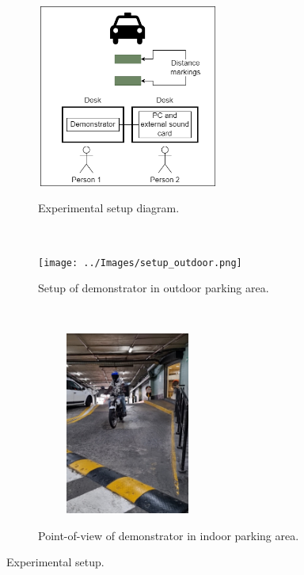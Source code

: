 \documentclass[class=report,11pt,crop=false]{standalone}
\begin{document}
\begin{figure}[htbp]
    \centering
    \captionsetup{type=figure}
    \begin{subfigure}[t]{0.5\textwidth}
        \centering
        \def\svgwidth{1\linewidth}
        {\scriptsize
            \includegraphics[width=6cm,height=6cm]{../Images/experimental_setup.drawio.png}}
        \caption{Experimental setup diagram.}
        \label{fig:setup-diagram}
    \end{subfigure}
    ~ 
    \begin{subfigure}[t]{0.4\textwidth}
        \def\svgwidth{1\linewidth}
        {\scriptsize
            \texttt{[image: ../Images/setup\_outdoor.png]}}
        \caption{Setup of demonstrator in outdoor parking area.}
        \label{fig:setup-outdoor}
    \end{subfigure}
    ~
    \begin{subfigure}[t]{0.5\textwidth}
        \centering
        \def\svgwidth{1\linewidth}
        {\scriptsize
            \includegraphics[width=6cm,height=6cm]{../Images/setup_indoor.png}}
        \caption{Point-of-view of demonstrator in indoor parking area.}
        \label{fig:setup-indoor}
    \end{subfigure}
    \caption{Experimental setup.}
    \label{fig:setup}
\end{figure}
\end{document}

